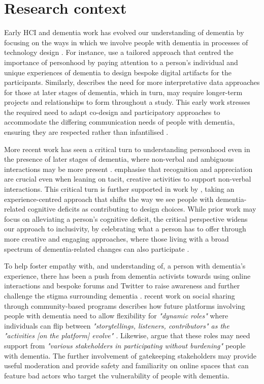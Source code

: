\section{Research context}
Early HCI and dementia work has evolved our understanding of dementia by focusing on the ways in which we involve people with dementia in processes of technology design \citep{lindsay_empathy_2012, suijkerbuijk_active_2019,vines_configuring_2013,wallace_enabling_2012-1}. For instance, \cite{wallace_design-led_2013} use a tailored approach that centred the importance of personhood by paying attention to a person’s individual and unique experiences of dementia to design bespoke digital artifacts for the participants. Similarly, \cite{lindsay_empathy_2012} describes the need for more interpretative data approaches for those at later stages of dementia, which in turn, may require longer-term projects and relationships to form throughout a study. This early work stresses the required need to adapt co-design and participatory approaches to accommodate the differing communication needs of people with dementia, ensuring they are respected rather than infantilised \citep{morrissey_im_2016,muriana2016you}. 

More recent work has seen a critical turn to understanding personhood even in the presence of later stages of dementia, where non-verbal and ambiguous interactions may be more present \citep{dupuis_re-claiming_2016}. \cite{treadaway_sensor_2016} emphasise that recognition and appreciation are crucial even when leaning on tacit, creative activities to support non-verbal interactions. This critical turn is further supported in work by \cite{morrissey_value_2017}, taking an experience-centred approach that shifts the way we see people with dementia-related cognitive deficits as contributing to design choices. While prior work may focus on alleviating a person's cognitive deficit, the critical perspective widens our approach to inclusivity, by celebrating what a person has to offer through more creative and engaging approaches, where those living with a broad spectrum of dementia-related changes can also participate \citep{lazar_critical_2017}.

To help foster empathy with, and understanding of, a person with dementia's experience, there has been a push from dementia activists towards using online interactions and bespoke forums and Twitter to raise awareness and further challenge the stigma surrounding dementia \citep{talbot_how_2020}. \cite{dai2020making} recent work on social sharing through community-based programs describes how future platforms involving people with dementia need to allow flexibility for \textit{"dynamic roles"} where individuals can flip between \textit{"storytellings, listeners, contributors" as the "activities [on the platform] evolve" \citep[pg.10]{dai2020making}}. Likewise, \cite{johnson_older_2019} argue that these roles may need support from \textit{"various stakeholders in participating without burdening" \citep[pg. 127]{johnson_older_2019}} people with dementia. The further involvement of gatekeeping stakeholders may provide useful moderation and provide safety and familiarity on online spaces that can feature bad actors who target the vulnerability of people with dementia. 

